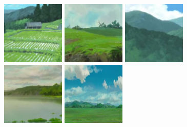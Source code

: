\documentclass[10pt,twocolumn,letterpaper]{article}
\begin{document}



\begin{figure}[!htb]
\centering     %
\subfigure
{\includegraphics[width=30mm]{best_ones/4999_real_A.png}}
\subfigure
{\includegraphics[width=30mm]{best_ones/5407_real_A.png}}
\subfigure
{\includegraphics[width=30mm]{best_ones/5130_real_A.png}}
\subfigure
{\includegraphics[width=30mm]{best_ones/5468_real_A.png}}
\subfigure
{\label{fig:a}\includegraphics[width=30mm]{best_ones/616_real_A.png}}


\end{figure}
\end{document}

